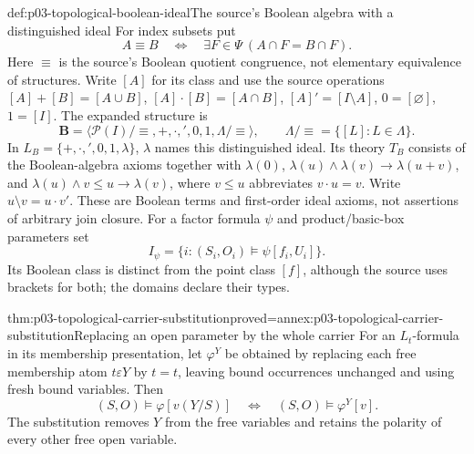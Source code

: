 \begin{hbdefinition}{def:p03-topological-boolean-ideal}{The source's Boolean algebra with a distinguished ideal}
For index subsets put
\[
 A\equiv B\quad\Longleftrightarrow\quad
           \exists F\in\Psi\ (A\cap F=B\cap F).
\]
Here \(\equiv\) is the source's Boolean quotient congruence, not
elementary equivalence of structures. Write \([A]\) for its class and
use the source operations \([A]+[B]=[A\cup B]\),
\([A]\cdot[B]=[A\cap B]\), \([A]'=[I\setminus A]\),
\(0=[\varnothing]\), \(1=[I]\). The expanded structure is
\[
 \mathbf B=\langle\mathcal P(I)/{\equiv},+,\cdot,',0,1,
                                  \Lambda/{\equiv}\rangle,
 \qquad \Lambda/{\equiv}=\{[L]:L\in\Lambda\}.
\]
In \(L_B=\{+,\cdot,',0,1,\lambda\}\), \(\lambda\) names this
distinguished ideal. Its theory \(T_B\) consists of the Boolean-algebra
axioms together with
\(\lambda(0)\),
\(\lambda(u)\land\lambda(v)\to\lambda(u+v)\), and
\(\lambda(u)\land v\le u\to\lambda(v)\), where
\(v\le u\) abbreviates \(v\cdot u=v\).
Write \(u\setminus v=u\cdot v'\). These are Boolean terms and
first-order ideal axioms, not assertions of arbitrary join closure.
For a factor formula \(\psi\) and product/basic-box parameters set
\[
        I_\psi=\{i:(S_i,O_i)\models\psi[f_i,U_i]\}.
\]
Its Boolean class is distinct from the point class \([f]\), although
the source uses brackets for both; the domains declare their types.
\end{hbdefinition}

\begin{hblemma}{thm:p03-topological-carrier-substitution}{proved=annex:p03-topological-carrier-substitution}{Replacing an open parameter by the whole carrier}
For an \(L_t\)-formula in its membership presentation, let
\(\varphi^Y\) be obtained by replacing each free membership atom
\(t\varepsilon Y\) by \(t=t\), leaving bound occurrences unchanged
and using fresh bound variables. Then
\[
             (S,O)\models\varphi[v(Y/S)]
               \quad\Longleftrightarrow\quad
             (S,O)\models\varphi^Y[v].
\]
The substitution removes \(Y\) from the free variables and retains
the polarity of every other free open variable.
\end{hblemma}

